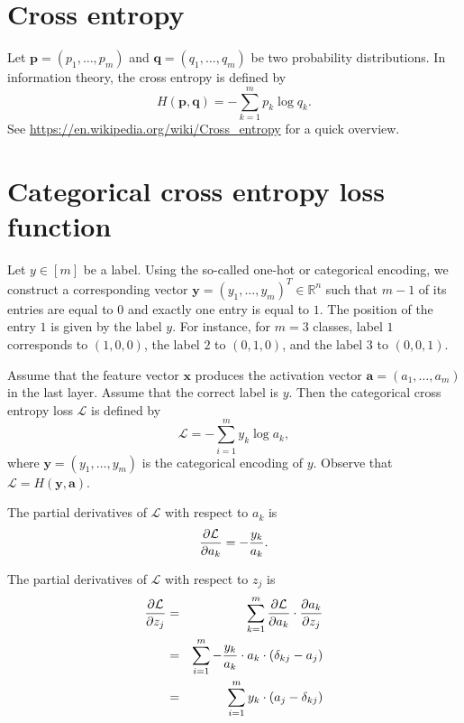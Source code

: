 \documentclass[12pt]{article}
\newcommand{\R}{\mathbb{R}}
\newcommand{\x}{\boldsymbol{x}}
\newcommand{\y}{\boldsymbol{y}}
\begin{document}
\section{Cross entropy}

Let $\boldsymbol{p}=(p_1,\ldots,p_m)$ and $\boldsymbol{q}=(q_1,\ldots,q_m)$ be two probability distributions. In information theory, the cross entropy is defined by
\begin{equation}
H(\boldsymbol{p},\boldsymbol{q}) = - \sum_{k=1}^m p_k \log q_k.
\end{equation}
See \url{https://en.wikipedia.org/wiki/Cross_entropy} for a quick overview.

\section{Categorical cross entropy loss function}

Let $y\in[m]$ be a label. Using the so-called one-hot or categorical encoding, we construct a corresponding vector $\boldsymbol{y}=(y_1,\ldots,y_m)^T\in\R^n$ such that $m-1$ of its entries are equal to $0$ and exactly one entry is equal to $1$. The position of the entry $1$ is given by the label $y$. For instance, for $m=3$ classes, label $1$ corresponds to $(1,0,0)$, the label $2$ to $(0,1,0)$, and the label $3$ to $(0,0,1)$.

Assume that the feature vector $\x$ produces the activation vector $\boldsymbol{a}=(a_1,\ldots,a_m)$ in the last layer. Assume that the correct label is $y$. Then the categorical cross entropy loss $\mathcal{L}$ is defined by
\begin{equation}
\mathcal{L} = -\sum_{i=1}^m y_k \log a_k,
\end{equation}
where $\y=(y_1,\ldots,y_m)$ is the categorical encoding of $y$. Observe that $\mathcal{L}=H(\y,\boldsymbol{a})$.

The partial derivatives of $\mathcal{L}$ with respect to $a_k$ is
\begin{equation}
{\partial \mathcal{L} \over \partial a_k} = -\frac{y_k}{a_k}.
\end{equation}

The partial derivatives of $\mathcal{L}$ with respect to $z_j$ is
\begin{eqnarray}
{\partial \mathcal{L} \over \partial z_j} 
& = &
\sum_{k=1}^m {\partial \mathcal{L} \over \partial a_k} \cdot {\partial a_k \over \partial z_j} \\
& = &
\sum_{i=1}^m -\frac{y_k}{a_k} \cdot a_k \cdot (\delta_{kj} - a_j)  \\
& = &
\sum_{i=1}^m y_k \cdot (a_j - \delta_{kj})
\end{eqnarray}
\end{document}
